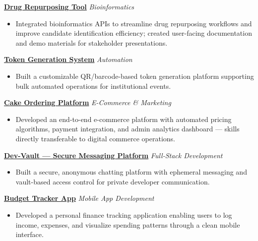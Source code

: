\documentclass[10pt, a4paper]{article}
\newcommand{\roleentry}[2]{%
  \textbf{#1} \hfill \textit{#2}%
}
\newenvironment{rlist}{%
  \begin{itemize}[
    leftmargin=1.4em,
    itemsep=1.5pt,
    parsep=0pt,
    topsep=2pt,
    label=\textcolor{accentNavy}{\textbullet}
  ]
}{\end{itemize}}
\begin{document}
\vspace{4pt}

\roleentry{\href{https://rx-discover.vercel.app/}{Drug Repurposing Tool}}{Bioinformatics}
\begin{rlist}
  \item Integrated bioinformatics APIs to streamline drug repurposing workflows and improve candidate identification efficiency; created user-facing documentation and demo materials for stakeholder presentations.
\end{rlist}

\vspace{4pt}

\roleentry{\href{https://token-generator-kappa.vercel.app/}{Token Generation System}}{Automation}
\begin{rlist}
  \item Built a customizable QR/barcode-based token generation platform supporting bulk automated operations for institutional events.
\end{rlist}

\vspace{4pt}

\roleentry{\href{https://shopofkakes.vercel.app/}{Cake Ordering Platform}}{E-Commerce \& Marketing}
\begin{rlist}
  \item Developed an end-to-end e-commerce platform with automated pricing algorithms, payment integration, and admin analytics dashboard --- skills directly transferable to digital commerce operations.
\end{rlist}

\vspace{4pt}

\roleentry{\href{https://dev-vault-henna.vercel.app/}{Dev-Vault --- Secure Messaging Platform}}{Full-Stack Development}
\begin{rlist}
  \item Built a secure, anonymous chatting platform with ephemeral messaging and vault-based access control for private developer communication.
\end{rlist}

\vspace{4pt}

\roleentry{\href{https://drive.google.com/file/d/1hCiXQusxk5kJf9N-2s-LCA1J5t5vHkFv/view?usp=sharing}{Budget Tracker App}}{Mobile App Development}
\begin{rlist}
  \item Developed a personal finance tracking application enabling users to log income, expenses, and visualize spending patterns through a clean mobile interface.
\end{rlist}
\end{document}
